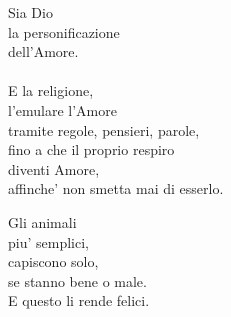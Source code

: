 \begin{haiku}
    Sia Dio\\
    la personificazione\\
    dell'Amore.\\
    \leavevmode\\
    E la religione,\\
    l'emulare l'Amore\\
    tramite regole, pensieri, parole,\\
    fino a che il proprio respiro\\
    diventi Amore,\\
    affinche' non smetta mai di esserlo.\\
\end{haiku}




\begin{haiku}
    Gli animali\\
    piu' semplici,\\
    capiscono solo,\\
    se stanno bene o male.\\
    E questo li rende felici.\\
\end{haiku}

